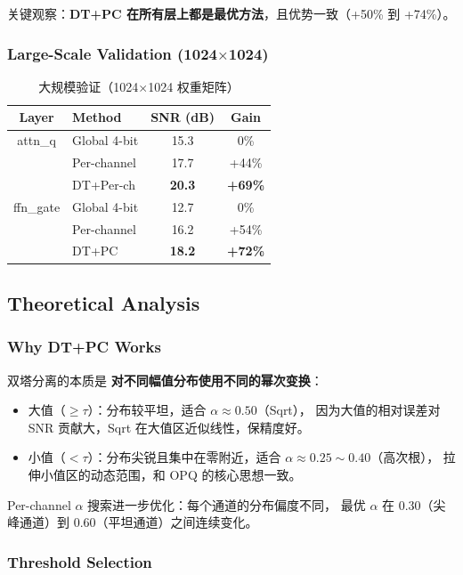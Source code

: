 关键观察：\textbf{DT+PC 在所有层上都是最优方法}，且优势一致（+50\% 到 +74\%）。

\subsubsection{Large-Scale Validation (1024$\times$1024)}

\begin{table}[h]
\centering
\caption{大规模验证（1024$\times$1024 权重矩阵）}
\begin{tabular}{c|l|c|c}
\hline
Layer & Method & SNR (dB) & Gain \\
\hline
attn\_q & Global 4-bit & 15.3 & 0\% \\
 & Per-channel & 17.7 & +44\% \\
 & DT+Per-ch & \textbf{20.3} & \textbf{+69\%} \\
\hline
ffn\_gate & Global 4-bit & 12.7 & 0\% \\
 & Per-channel & 16.2 & +54\% \\
 & DT+PC & \textbf{18.2} & \textbf{+72\%} \\
\hline
\end{tabular}
\end{table}

\subsection{Theoretical Analysis}

\subsubsection{Why DT+PC Works}

双塔分离的本质是 \textbf{对不同幅值分布使用不同的幂次变换}：
\begin{itemize}
\item 大值（$\geq \tau$）：分布较平坦，适合 $\alpha \approx 0.50$（Sqrt），
  因为大值的相对误差对 SNR 贡献大，Sqrt 在大值区近似线性，保精度好。
\item 小值（$< \tau$）：分布尖锐且集中在零附近，适合 $\alpha \approx 0.25 \sim 0.40$（高次根），
  拉伸小值区的动态范围，和 OPQ 的核心思想一致。
\end{itemize}

Per-channel $\alpha$ 搜索进一步优化：每个通道的分布偏度不同，
最优 $\alpha$ 在 0.30（尖峰通道）到 0.60（平坦通道）之间连续变化。

\subsubsection{Threshold Selection}

